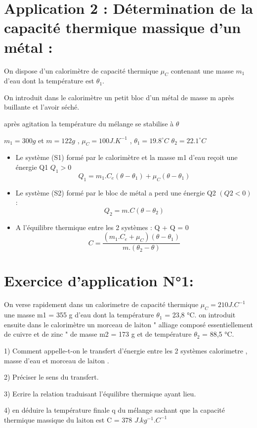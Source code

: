 \documentclass[12pt]{article}
\begin{document}
\section{Application 2 : Détermination de la capacité thermique massique d'un métal : }

On dispose d'un calorimètre de capacité thermique $\mu_C$ contenant une masse $m_1$ d'eau dont la température est $\theta_1$.

On introduit dans le calorimètre un petit bloc d'un métal de masse m après buillante et l'avoir séché.

après agitation la température du mélange se stabilise à $\theta$

$m_1 = 300g$ et $m = 122g$ , $\mu_C = 100J.K^{-1}$ , $\theta_1 = 19.8 ^\circ{C}$ $\theta_2 = 22.1 ^\circ{C}$

\begin{itemize}
        \item Le système (S1) formé par le calorimètre et la masse m1 d'eau
reçoit une énergie Q1 $Q_1 > 0$ $$Q_1 = m_1.C_e(\theta - \theta_1) + \mu_C(\theta - \theta_1)$$
\item Le système (S2) formé par le bloc de métal a perd une énergie Q2 $(Q2 < 0)$:
    $$Q_2 = m.C(\theta - \theta_2)$$
        \item A l'équilibre thermique entre les 2 systèmes : Q + Q = 0 
            $$C = \frac{(m_1.C_e + \mu_C)(\theta - \theta_1)}{m.(\theta_2 - \theta)}$$
\end{itemize}

\section{Exercice d'application N°1:}
On verse rapidement dans un calorimetre de capacité thermique $\mu_C = 210 J.C^{-1}$
une
masse m1 = 355 g d'eau dont la température $\theta_1$ = 23,8 °C. on introduit ensuite dans le
calorimètre un morceau de laiton " alliage composé essentiellement de cuivre et de zinc "
de masse m2 = 173 g et de température $\theta_2$ = 88,5 °C.

1) Comment appelle-t-on le transfert d'énergie entre les 2 systèmes {calorimetre , masse d'eau} et {morceau de laiton} . 

2) Préciser le sens du transfert.

3) Ecrire la relation traduisant l'équilibre thermique ayant lieu.

4) en déduire la température finale q du mélange sachant que la capacité thermique
massique du laiton est C = 378 $J.kg^{-1}.C^{-1}$
\end{document}
